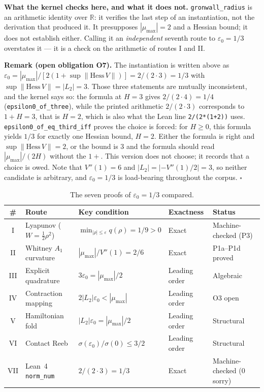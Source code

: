 \documentclass[14pt,a4paper]{extarticle}
\begin{document}
\noindent
\textbf{What the kernel checks here, and what it does not.}
\texttt{gronwall\_radius} is an arithmetic identity over $\mathbb{R}$: it
verifies the last step of an instantiation, not the derivation that
produced it. It presupposes $|\mu_{\max}| = 2$ and a Hessian bound; it does
not establish either. Calling it an \emph{independent} seventh route to
$\varepsilon_0 = 1/3$ overstates it --- it is a check on the arithmetic of
routes I and II.

\medskip
\noindent
\textbf{Remark (open obligation O7).}
The instantiation is written above as
$\varepsilon_0 = |\mu_{\max}|/[2(1+\sup\|\mathrm{Hess}\,V\|)] = 2/(2\cdot 3) = 1/3$
with $\sup\|\mathrm{Hess}\,V\| = |L_2| = 3$.
Those three statements are mutually inconsistent, and the kernel says so:
the formula at $H = 3$ gives $2/(2\cdot 4) = 1/4$
(\texttt{epsilon0\_of\_three}), while the printed arithmetic $2/(2\cdot 3)$
corresponds to $1 + H = 3$, that is $H = 2$, which is also what the Lean
line \texttt{2/(2*(1+2))} uses. \texttt{epsilon0\_of\_eq\_third\_iff}
proves the choice is forced: for $H \ge 0$, this formula yields $1/3$ for
exactly one Hessian bound, $H = 2$. Either the formula is right and
$\sup\|\mathrm{Hess}\,V\| = 2$, or the bound is $3$ and the formula should
read $|\mu_{\max}|/(2H)$ without the $1+$. This version does not choose;
it records that a choice is owed. Note that $V''(1) = 6$ and
$|L_2| = |{-V''(1)/2}| = 3$, so neither candidate is arbitrary, and
$\varepsilon_0 = 1/3$ is load-bearing throughout the corpus.
\hfill$\square$

\bigskip

\begin{table}[ht]
\centering
\small
\caption{The seven proofs of $\varepsilon_0=1/3$ compared.}
\label{tab:seven-proofs}
\begin{tabular}{cllll}
\toprule
\# & Route & Key condition & Exactness & Status \\
\midrule
I   & Lyapunov ($W=\tfrac12\rho^2$)  & $\min_{|\rho|\le\varepsilon}q(\rho)=1/9>0$ & Exact & Machine-checked (P3) \\
II  & Whitney $A_1$ curvature         & $|\mu_{\max}|/V''(1)=2/6$                  & Exact & P1a--P1d proved \\
III & Explicit quadrature              & $3\varepsilon_0=|\mu_{\max}|/2$             & Leading order & Algebraic \\
IV  & Contraction mapping             & $2|L_2|\varepsilon_0<|\mu_{\max}|$          & Leading order & O3 open \\
V   & Hamiltonian fold                 & $|L_2|\varepsilon_0=|\mu_{\max}|/2$         & Leading order & Structural \\
VI  & Contact Reeb                     & $\sigma(\varepsilon_0)/\sigma(0)\le 3/2$   & Leading order & Structural \\
VII & Lean~4 \texttt{norm\_num}        & $2/(2\!\cdot\!3)=1/3$                      & Exact & Machine-checked (0 sorry) \\
\bottomrule
\end{tabular}
\end{table}
\end{document}
